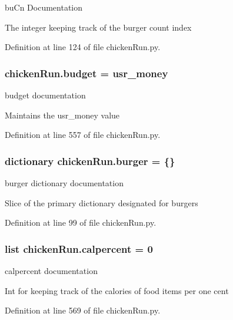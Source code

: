bu\-Cn Documentation 

The integer keeping track of the burger count index 

Definition at line 124 of file chicken\-Run.\-py.

\hypertarget{namespacechickenRun_aeb092fe21020a0c610642d7862bbb251}{
\subsubsection[{budget}]{\setlength{\rightskip}{0pt plus 5cm}chicken\-Run.\-budget = {\bf usr\-\_\-money}}}\label{namespacechickenRun_aeb092fe21020a0c610642d7862bbb251}


budget documentation 

Maintains the usr\-\_\-money value 

Definition at line 557 of file chicken\-Run.\-py.

\hypertarget{namespacechickenRun_a8716106c839954fcf4ec3f8ee587da84}{
\subsubsection[{burger}]{\setlength{\rightskip}{0pt plus 5cm}dictionary chicken\-Run.\-burger = \{\}}}\label{namespacechickenRun_a8716106c839954fcf4ec3f8ee587da84}


burger dictionary documentation 

Slice of the primary dictionary designated for burgers 

Definition at line 99 of file chicken\-Run.\-py.

\hypertarget{namespacechickenRun_a8a186f8153320bff49ffaae4b2f575ee}{
\subsubsection[{calpercent}]{\setlength{\rightskip}{0pt plus 5cm}list chicken\-Run.\-calpercent = 0}}\label{namespacechickenRun_a8a186f8153320bff49ffaae4b2f575ee}


calpercent documentation 

Int for keeping track of the calories of food items per one cent 

Definition at line 569 of file chicken\-Run.\-py.

